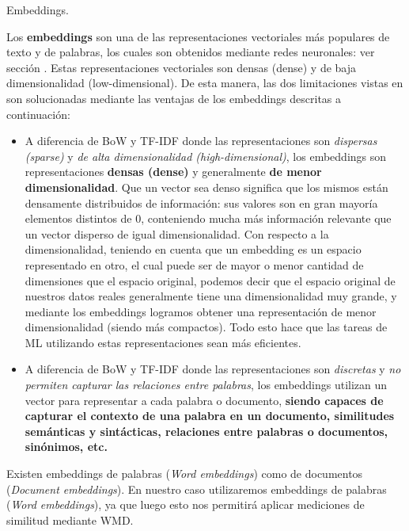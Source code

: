 \documentclass[12pt,a4paper]{article}
\makeatletter
\renewcommand\paragraph{\@startsection{paragraph}{4}{\z@}
            {-2.5ex\@plus -1ex \@minus -.25ex}
            {1.25ex \@plus .25ex}
            {\normalfont\normalsize\bfseries}}
\makeatother
\begin{document}
\begin{sloppypar}
\paragraph{Embeddings.}\label{embedd}

Los \textbf{embeddings} son una de las representaciones vectoriales más populares de texto y de palabras, los cuales son obtenidos mediante redes neuronales: ver sección \textit{}. Estas representaciones vectoriales son densas (dense) y de baja dimensionalidad (low-dimensional)\cite{NLP_26}. De esta manera, las dos limitaciones vistas en \textit{} son solucionadas mediante las ventajas de los embeddings descritas a continuación:
\begin{itemize}
\item A diferencia de BoW y TF-IDF donde las representaciones son \textit{dispersas (sparse)} y \textit{de alta dimensionalidad (high-dimensional)}, los embeddings son representaciones \textbf{densas (dense)} y generalmente \textbf{de menor dimensionalidad}. Que un vector sea denso significa que los mismos están densamente distribuidos de información: sus valores son en gran mayoría elementos distintos de 0, conteniendo mucha más información relevante que un vector disperso de igual dimensionalidad\cite{NLP_9}. Con respecto a la dimensionalidad, teniendo en cuenta que un embedding es un espacio representado en otro, el cual puede ser de mayor o menor cantidad de dimensiones que el espacio original, podemos decir que el espacio original de nuestros datos reales generalmente tiene una dimensionalidad muy grande, y mediante los embeddings  logramos obtener una representación de menor dimensionalidad (siendo más compactos)\cite{apunte_uba}. Todo esto hace que las tareas de ML utilizando estas representaciones sean más eficientes. 
\item A diferencia de BoW y TF-IDF donde las representaciones son \textit{discretas} y \textit{no permiten capturar las relaciones entre palabras}, los embeddings utilizan un vector para representar a cada palabra o documento, \textbf{siendo capaces de capturar el contexto de una palabra en un documento, similitudes semánticas y sintácticas, relaciones entre palabras o documentos, sinónimos, etc.} 
\end{itemize}

Existen embeddings de palabras (\textit{Word embeddings}) como de documentos (\textit{Document embeddings})\cite{NLP_10}. En nuestro caso utilizaremos embeddings de palabras (\textit{Word embeddings}), ya que luego esto nos permitirá aplicar mediciones de similitud mediante WMD. 


\end{sloppypar}
\end{document}
